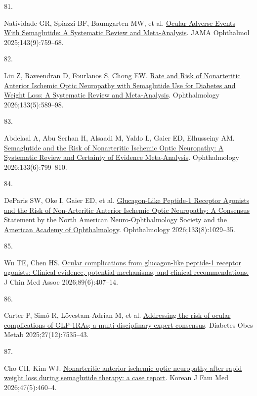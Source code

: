\documentclass[
  11pt,
]{article}
\newlength{\cslhangindent}
\newlength{\csllabelwidth}
\newenvironment{CSLReferences}[2] %
 {\begin{list}{}{%
  \setlength{\itemindent}{0pt}
  \setlength{\leftmargin}{0pt}
  \setlength{\parsep}{0pt}
  \ifodd #1
   \setlength{\leftmargin}{\cslhangindent}
   \setlength{\itemindent}{-1\cslhangindent}
  \fi
  \setlength{\itemsep}{#2\baselineskip}}}
 {\end{list}}
\newcommand{\CSLLeftMargin}[1]{\parbox[t]{\csllabelwidth}{\strut#1\strut}}
\newcommand{\CSLRightInline}[1]{\parbox[t]{\linewidth - \csllabelwidth}{\strut#1\strut}}
\begin{document}
\begin{CSLReferences}{0}{1}
\CSLLeftMargin{81. }%
\CSLRightInline{Natividade GR, Spiazzi BF, Baumgarten MW, et al.
\href{https://doi.org/10.1001/jamaophthalmol.2025.2489}{{Ocular Adverse
Events With Semaglutide: A Systematic Review and Meta-Analysis}}. JAMA
Ophthalmol 2025;143(9):759--68. }

\CSLLeftMargin{82. }%
\CSLRightInline{Liu Z, Raveendran D, Fourlanos S, Chong EW.
\href{https://doi.org/10.1016/j.ophtha.2025.12.022}{{Rate and Risk of
Nonarteritic Anterior Ischemic Optic Neuropathy with Semaglutide Use for
Diabetes and Weight Loss: A Systematic Review and Meta-Analysis}}.
Ophthalmology 2026;133(5):589--98. }

\CSLLeftMargin{83. }%
\CSLRightInline{Abdelaal A, Abu Serhan H, Alsaadi M, Yaldo L, Gaier ED,
Elhusseiny AM.
\href{https://doi.org/10.1016/j.ophtha.2026.02.013}{{Semaglutide and the
Risk of Nonarteritic Ischemic Optic Neuropathy: A Systematic Review and
Certainty of Evidence Meta-Analysis}}. Ophthalmology
2026;133(6):799--810. }

\CSLLeftMargin{84. }%
\CSLRightInline{DeParis SW, Oke I, Gaier ED, et al.
\href{https://doi.org/10.1016/j.ophtha.2026.04.008}{{Glucagon-Like
Peptide-1 Receptor Agonists and the Risk of Non-Arteritic Anterior
Ischemic Optic Neuropathy: A Consensus Statement by the North American
Neuro-Ophthalmology Society and the American Academy of Ophthalmology}}.
Ophthalmology 2026;133(8):1029--35. }

\CSLLeftMargin{85. }%
\CSLRightInline{Wu TE, Chen HS.
\href{https://doi.org/10.1097/JCMA.0000000000001370}{{Ocular
complications from glucagon-like peptide-1 receptor agonists: Clinical
evidence, potential mechanisms, and clinical recommendations.}} J Chin
Med Assoc 2026;89(6):407--14. }

\CSLLeftMargin{86. }%
\CSLRightInline{Carter P, Simó R, Lövestam-Adrian M, et al.
\href{https://doi.org/10.1111/dom.70160}{{Addressing the risk of ocular
complications of GLP-1RAs; a multi-disciplinary expert consensus}}.
Diabetes Obes Metab 2025;27(12):7535--43. }

\CSLLeftMargin{87. }%
\CSLRightInline{Cho CH, Kim WJ.
\href{https://doi.org/10.4082/kjfm.26.0135}{{Nonarteritic anterior
ischemic optic neuropathy after rapid weight loss during semaglutide
therapy: a case report}}. Korean J Fam Med 2026;47(5):460--4. }


\end{CSLReferences}
\end{document}
